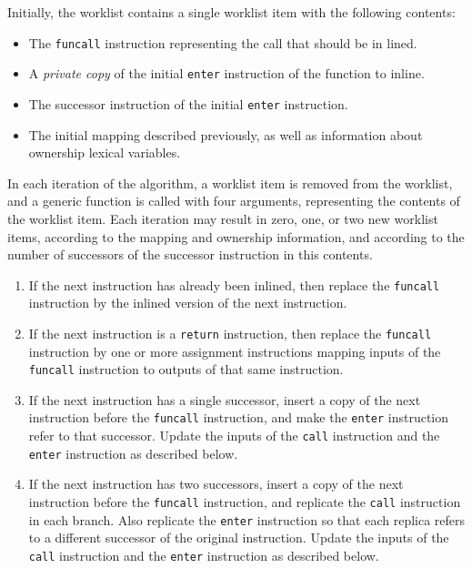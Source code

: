 Initially, the worklist contains a single worklist item with the
following contents:

\begin{itemize}
\item The \texttt{funcall} instruction representing the call that
  should be in lined.
\item A \emph{private copy} of the initial \texttt{enter} instruction
  of the function to inline.
\item The successor instruction of the initial \texttt{enter}
  instruction.
\item The initial mapping described previously, as well as
  information about ownership lexical variables.
\end{itemize}

In each iteration of the algorithm, a worklist item is removed from
the worklist, and a generic function is called with four arguments,
representing the contents of the worklist item.  Each iteration may
result in zero, one, or two new worklist items, according to the
mapping and ownership information, and according to the number of
successors of the successor instruction in this contents.

\begin{enumerate}
\item If the next instruction has already been inlined, then replace
  the \texttt{funcall} instruction by the inlined version of the next
  instruction.
\item If the next instruction is a \texttt{return} instruction, then
  replace the \texttt{funcall} instruction by one or more assignment
  instructions mapping inputs of the \texttt{funcall} instruction to
  outputs of that same instruction.
\item If the next instruction has a single successor, insert a copy of
  the next instruction before the \texttt{funcall} instruction, and
  make the \texttt{enter} instruction refer to that successor.  Update
  the inputs of the \texttt{call} instruction and the \texttt{enter}
  instruction as described below.
\item If the next instruction has two successors, insert a copy of the
  next instruction before the \texttt{funcall} instruction, and
  replicate the \texttt{call} instruction in each branch.  Also
  replicate the \texttt{enter} instruction so that each replica refers
  to a different successor of the original instruction.  Update the
  inputs of the \texttt{call} instruction and the \texttt{enter}
  instruction as described below.
\end{enumerate}

